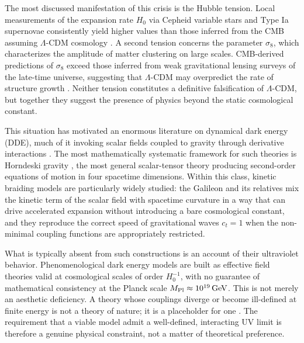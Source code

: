 \documentclass[12pt,a4paper]{article}
\begin{document}
The most discussed manifestation of this crisis is the Hubble tension. Local
measurements of the expansion rate $H_0$ via Cepheid variable stars and Type Ia
supernovae consistently yield higher values than those inferred from the CMB
assuming $\Lambda$-CDM cosmology \cite{Riess2019,Planck2018}. A second tension
concerns the parameter $\sigma_8$, which characterizes the amplitude of matter
clustering on large scales. CMB-derived predictions of $\sigma_8$ exceed those
inferred from weak gravitational lensing surveys of the late-time universe,
suggesting that $\Lambda$-CDM may overpredict the rate of structure growth
\cite{Mukhanov2005,Dodelson2003}. Neither tension constitutes a definitive
falsification of $\Lambda$-CDM, but together they suggest the presence of
physics beyond the static cosmological constant.

This situation has motivated an enormous literature on dynamical dark energy
(DDE), much of it invoking scalar fields coupled to gravity through derivative
interactions \cite{Clifton2012}. The most mathematically systematic framework
for such theories is Horndeski gravity \cite{Horndeski1974}, the most general
scalar-tensor theory producing second-order equations of motion in four
spacetime dimensions. Within this class, kinetic braiding models are
particularly widely studied: the Galileon and its relatives \cite{Nicolis2009}
mix the kinetic term of the scalar field with spacetime curvature in a way
that can drive accelerated expansion without introducing a bare cosmological
constant, and they reproduce the correct speed of gravitational waves $c_t = 1$
when the non-minimal coupling functions are appropriately restricted.

What is typically absent from such constructions is an account of their
ultraviolet behavior. Phenomenological dark energy models are built as
effective field theories valid at cosmological scales of order $H_0^{-1}$,
with no guarantee of mathematical consistency at the Planck scale $M_{\rm Pl}
\approx 10^{19}\,\text{GeV}$. This is not merely an aesthetic deficiency. A
theory whose couplings diverge or become ill-defined at finite energy is not
a theory of nature; it is a placeholder for one \cite{Polchinski1984,
ZinnJustin2002}. The requirement that a viable model admit a well-defined,
interacting UV limit is therefore a genuine physical constraint, not a
matter of theoretical preference.
\end{document}
